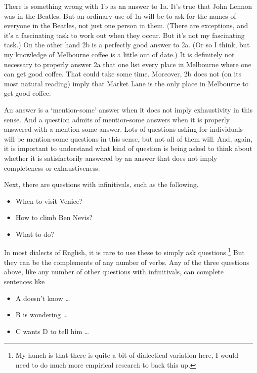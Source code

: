 \documentclass[
  12pt,
  letterpaper,
]{scrbook}
\providecommand{\tightlist}{%
  \setlength{\itemsep}{0pt}\setlength{\parskip}{0pt}}\usepackage{longtable,booktabs,array}
\begin{document}
There is something wrong with 1b as an answer to 1a. It's true that John
Lennon was in the Beatles. But an ordinary use of 1a will be to ask for
the names of everyone in the Beatles, not just one person in them.
(There are exceptions, and it's a fascinating task to work out when they
occur. But it's not my fascinating task.) On the other hand 2b is a
perfectly good answer to 2a. (Or so I think, but my knowledge of
Melbourne coffee is a little out of date.) It is definitely not
necessary to properly answer 2a that one list every place in Melbourne
where one can get good coffee. That could take some time. Moreover, 2b
does not (on its most natural reading) imply that Market Lane is the
only place in Melbourne to get good coffee.

An answer is a `mention-some' answer when it does not imply exhaustivity
in this sense. And a question admits of mention-some answers when it is
properly answered with a mention-some answer. Lots of questions asking
for individuals will be mention-some questions in this sense, but not
all of them will. And, again, it is important to understand what kind of
question is being asked to think about whether it is satisfactorily
answered by an answer that does not imply completeness or
exhaustiveness.

Next, there are questions with infinitivals, such as the following.

\begin{itemize}
\tightlist
\item
  When to visit Venice?
\item
  How to climb Ben Nevis?
\item
  What to do?
\end{itemize}

In most dialects of English, it is rare to use these to simply ask
questions.\footnote{My hunch is that there is quite a bit of dialectical
  variation here, I would need to do much more empirical research to
  back this up.} But they can be the complements of any number of verbs.
Any of the three questions above, like any number of other questions
with infinitivals, can complete sentences like

\begin{itemize}
\tightlist
\item
  A doesn't know \ldots{}
\item
  B is wondering \ldots{}
\item
  C wants D to tell him \ldots{}
\end{itemize}
\end{document}
